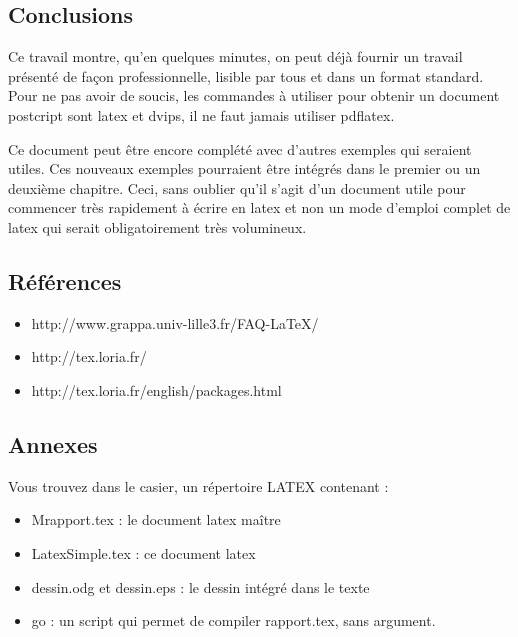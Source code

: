 \subsection{Conclusions}
Ce travail montre, qu'en quelques minutes, on peut déjà fournir un travail présenté de façon professionnelle, lisible par tous et dans un format standard.
Pour ne pas avoir de soucis, les commandes à utiliser pour obtenir un document postcript sont latex et dvips, il ne faut jamais utiliser pdflatex. 

Ce document peut être encore complété avec d'autres exemples qui seraient utiles. Ces nouveaux exemples pourraient être intégrés dans le premier ou un deuxième chapitre. Ceci, sans oublier qu'il s'agit d'un document utile pour commencer très rapidement à écrire en latex et non un mode d'emploi complet de latex qui serait obligatoirement très volumineux.
\subsection{Références}
\begin{itemize}
\item http://www.grappa.univ-lille3.fr/FAQ-LaTeX/ 
\item http://tex.loria.fr/
\item http://tex.loria.fr/english/packages.html
\end{itemize}
\subsection{Annexes }
Vous trouvez dans le casier, un répertoire LATEX contenant :
\begin{itemize}
\item Mrapport.tex : le document latex maître
\item LatexSimple.tex : ce document latex
\item dessin.odg et dessin.eps : le dessin intégré dans le texte
\item go : un script qui permet de compiler rapport.tex, sans argument.
\end{itemize}
